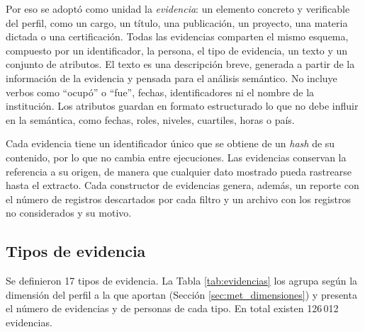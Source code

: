 Por eso se adoptó como unidad la \textit{evidencia}: un elemento concreto y verificable del perfil, como un cargo, un título, una publicación, un proyecto, una materia dictada o una certificación. Todas las evidencias comparten el mismo esquema, compuesto por un identificador, la persona, el tipo de evidencia, un texto y un conjunto de atributos. El texto es una descripción breve, generada a partir de la información de la evidencia y pensada para el análisis semántico. No incluye verbos como ``ocupó'' o ``fue'', fechas, identificadores ni el nombre de la institución. Los atributos guardan en formato estructurado lo que no debe influir en la semántica, como fechas, roles, niveles, cuartiles, horas o país.

Cada evidencia tiene un identificador único que se obtiene de un \textit{hash} de su contenido, por lo que no cambia entre ejecuciones. Las evidencias conservan la referencia a su origen, de manera que cualquier dato mostrado pueda rastrearse hasta el extracto. Cada constructor de evidencias genera, además, un reporte con el número de registros descartados por cada filtro y un archivo con los registros no considerados y su motivo.

\subsection{Tipos de evidencia}

Se definieron 17 tipos de evidencia. La Tabla \ref{tab:evidencias} los agrupa según la dimensión del perfil a la que aportan (Sección \ref{sec:met_dimensiones}) y presenta el número de evidencias y de personas de cada tipo. En total existen 126\,012 evidencias.

